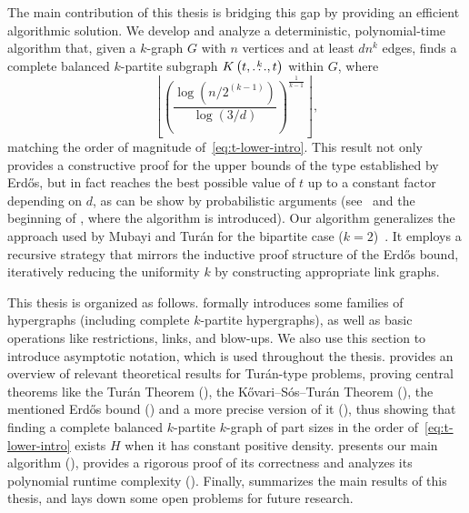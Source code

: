 The main contribution of this thesis is bridging this gap by providing an efficient algorithmic solution.
We develop and analyze a deterministic, polynomial-time algorithm that,
given a $k$-graph $G$ with $n$ vertices and at least $dn^k$ edges,
finds a complete balanced $k$-partite subgraph $K\left(t, \overset{k}{\dots}, t\right)$ within $G$, where
\[
    \left\lfloor \left(  \frac{\log \left(n/2^{(k-1)}\right)}{\log (3/d)} \right)^{\frac{1}{k-1}} \right\rfloor,
\]
matching the order of magnitude of~\eqref{eq:t-lower-intro}.
This result not only provides a constructive proof for the upper bounds of the type established by Erdős,
but in fact reaches the best possible value of $t$ up to a constant factor depending on $d$, as
can be show by probabilistic arguments (see~ and
the beginning of , where the algorithm is introduced).
Our algorithm generalizes the approach used by Mubayi and Turán for the bipartite case ($k=2$)~\cite{MUBAYI2010174}.
It employs a recursive strategy that mirrors the inductive proof structure of the Erdős bound,
iteratively reducing the uniformity $k$ by constructing appropriate link graphs.

This thesis is organized as follows.
 formally introduces some families of hypergraphs
(including complete $k$-partite hypergraphs),
as well as basic operations like restrictions, links, and blow-ups.
We also use this section to introduce asymptotic notation, which is used throughout the thesis.
 provides an overview of relevant theoretical results for Turán-type problems,
proving central theorems like the Turán Theorem (), the Kővari--Sós--Turán Theorem (),
the mentioned Erdős bound () and a more precise version of it (),
thus showing that finding a complete balanced $k$-partite $k$-graph of part sizes in the order of~\eqref{eq:t-lower-intro}
exists $H$ when it has constant positive density.
 presents our main algorithm (),
provides a rigorous proof of its correctness and analyzes its polynomial runtime complexity ().
Finally,  summarizes the main results of this thesis, and lays down some open problems for future research.
